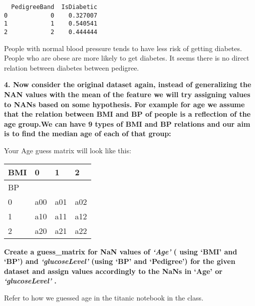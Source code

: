 \documentclass[11pt]{article}
\begin{document}
    
    
    \begin{verbatim}
  PedigreeBand  IsDiabetic
0            0    0.327007
1            1    0.540541
2            2    0.444444
    \end{verbatim}

    
    People with normal blood pressure tends to have less risk of getting
diabetes. People who are obese are more likely to get diabetes. It seems
there is no direct relation between diabetes between pedigree.

    \textbf{4. Now consider the original dataset again, instead of
generalizing the NAN values with the mean of the feature we will try
assigning values to NANs based on some hypothesis. For example for age
we assume that the relation between BMI and BP of people is a reflection
of the age group.We can have 9 types of BMI and BP relations and our aim
is to find the median age of each of that group:}

Your Age guess matrix will look like this:

\begin{longtable}[]{@{}llll@{}}
\toprule
BMI & 0 & 1 & 2\tabularnewline
\midrule
\endhead
BP & & &\tabularnewline
0 & a00 & a01 & a02\tabularnewline
1 & a10 & a11 & a12\tabularnewline
2 & a20 & a21 & a22\tabularnewline
\bottomrule
\end{longtable}

\textbf{Create a guess\_matrix for NaN values of \emph{`Age'} ( using
`BMI' and `BP') and \emph{`glucoseLevel'} (using `BP' and `Pedigree')
for the given dataset and assign values accordingly to the NaNs in `Age'
or \emph{`glucoseLevel'} .}

Refer to how we guessed age in the titanic notebook in the class.
\end{document}
